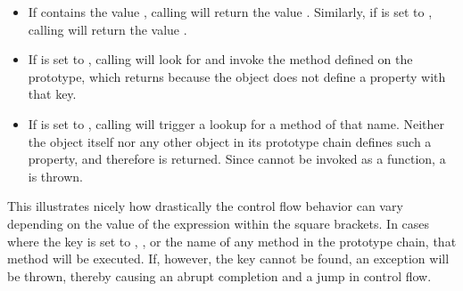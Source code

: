\begin{itemize}
  \item If  contains the value , calling  will return the value . Similarly, if  is set to , calling  will return the value .
  \item If  is set to , calling  will look for and invoke the  method defined on the  prototype, which returns  because the object does not define a property with that key.
  \item If  is set to , calling  will trigger a lookup for a method of that name. Neither the object itself nor any other object in its prototype chain defines such a property, and therefore  is returned. Since  cannot be invoked as a function, a  is thrown.
\end{itemize}

This illustrates nicely how drastically the control flow behavior can vary depending on the value of the expression within the square brackets. In cases where the key is set to , , or the name of any method in the prototype chain, that method will be executed. If, however, the key cannot be found, an exception will be thrown, thereby causing an abrupt completion and a jump in control flow.
